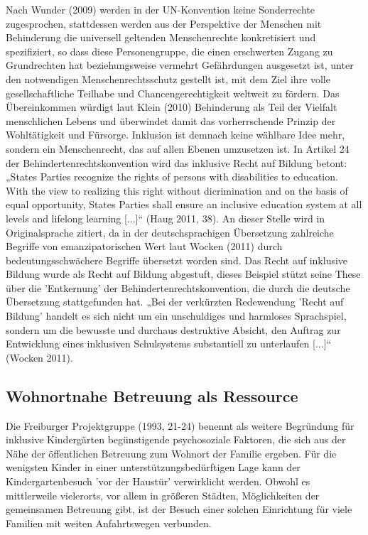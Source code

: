 Nach Wunder (2009) werden in der UN-Konvention keine Sonderrechte zugesprochen, stattdessen werden aus der Perspektive der Menschen mit Behinderung die universell geltenden Menschenrechte konkretisiert und spezifiziert, so dass diese Personengruppe, die einen erschwerten Zugang zu Grundrechten hat beziehungsweise vermehrt Gefährdungen ausgesetzt ist, unter den notwendigen Menschenrechtsschutz gestellt ist, mit dem Ziel ihre volle gesellschaftliche Teilhabe und Chancengerechtigkeit weltweit zu fördern. Das Übereinkommen würdigt laut Klein (2010) Behinderung als Teil der Vielfalt menschlichen Lebens und überwindet damit das vorherrschende Prinzip der Wohltätigkeit und Fürsorge. Inklusion ist demnach keine wählbare Idee mehr, sondern ein Menschenrecht, das auf allen Ebenen umzusetzen ist. In Artikel 24 der Behindertenrechtskonvention wird das inklusive Recht auf Bildung betont: „States Parties recognize the rights of persons with disabilities to education. With the view to realizing this right without dicrimination and on the basis of equal opportunity, States Parties shall ensure an inclusive education system at all levels and lifelong learning [...]“ (Haug 2011, 38). An dieser Stelle wird in Originalsprache zitiert, da in der deutschsprachigen Übersetzung zahlreiche Begriffe von emanzipatorischen Wert laut Wocken (2011) durch bedeutungsschwächere Begriffe übersetzt worden sind. Das Recht auf inklusive Bildung wurde als Recht auf Bildung abgestuft, dieses Beispiel stützt seine These über die 'Entkernung' der Behindertenrechtskonvention, die durch die deutsche Übersetzung stattgefunden hat. „Bei der verkürzten Redewendung 'Recht auf Bildung' handelt es sich nicht um ein unschuldiges und harmloses Sprachspiel, sondern um die bewusste und durchaus destruktive Absicht, den Auftrag zur Entwicklung eines inklusiven Schulsystems substantiell zu unterlaufen [...]“ (Wocken 2011).

\subsection{Wohnortnahe Betreuung als Ressource}
Die Freiburger Projektgruppe (1993, 21-24) benennt als weitere Begründung für inklusive Kindergärten begünstigende psychosoziale Faktoren, die sich aus der Nähe der öffentlichen Betreuung zum Wohnort der Familie ergeben. Für die wenigsten Kinder in einer unterstützungsbedürftigen Lage kann der Kindergartenbesuch 'vor der Haustür' verwirklicht werden. Obwohl es mittlerweile vielerorts, vor allem in größeren Städten, Möglichkeiten der gemeinsamen Betreuung gibt, ist der Besuch einer solchen Einrichtung für viele Familien mit weiten Anfahrtswegen verbunden. 

